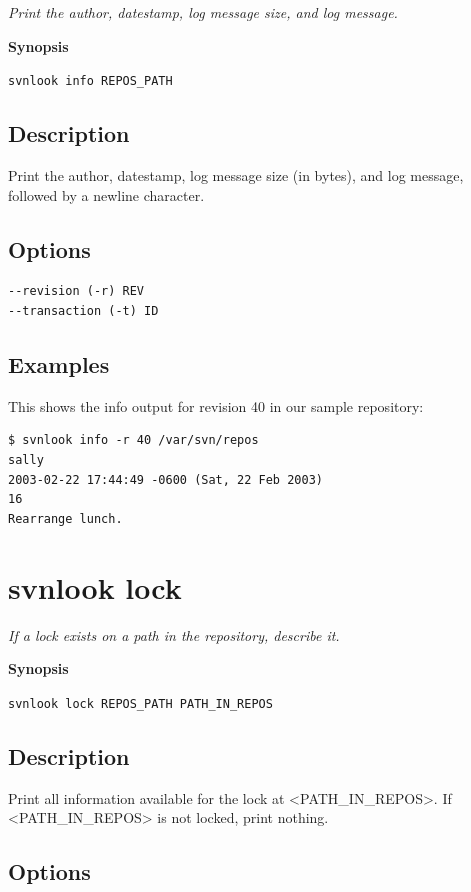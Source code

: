 \emph{Print the author, datestamp, log message size, and log message.}

\textbf{Synopsis}

\texttt{svnlook\ info\ REPOS\_PATH}

\subsection{Description}

Print the author, datestamp, log message size (in bytes), and log
message, followed by a newline character.

\subsection{Options}

\begin{verbatim}
--revision (-r) REV
--transaction (-t) ID
\end{verbatim}

\subsection{Examples}

This shows the info output for revision 40 in our sample repository:

\begin{verbatim}
$ svnlook info -r 40 /var/svn/repos
sally
2003-02-22 17:44:49 -0600 (Sat, 22 Feb 2003)
16
Rearrange lunch.
\end{verbatim}

\section{svnlook lock}\label{svn.ref.svnlook.c.lock}

\emph{If a lock exists on a path in the repository, describe it.}

\textbf{Synopsis}

\texttt{svnlook\ lock\ REPOS\_PATH\ PATH\_IN\_REPOS}

\subsection{Description}

Print all information available for the lock at
\textless PATH\_IN\_REPOS\textgreater. If
\textless PATH\_IN\_REPOS\textgreater{} is not locked, print nothing.

\subsection{Options}

